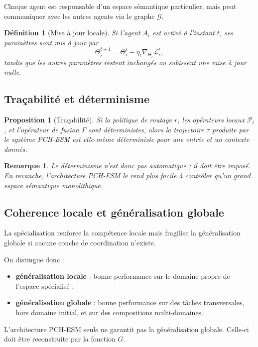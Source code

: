 \documentclass[11pt,a4paper]{article}
\newtheorem{definition}{Définition}[section]
\newtheorem{proposition}{Proposition}[section]
\newtheorem{remark}{Remarque}[section]
\newcommand{\Pcal}{\mathcal P}
\newcommand{\Gcal}{\mathcal G}
\newcommand{\1}{\mathbf 1}
\begin{document}
Chaque agent est responsable d'un espace sémantique particulier, mais peut communiquer avec les autres agents via le graphe \(\Gcal\).

\begin{definition}[Mise à jour locale]
Si l'agent \(A_i\) est activé à l'instant \(t\), ses paramètres sont mis à jour par
\[
\Theta_i^{t+1}
=
\Theta_i^t
-
\eta_t \nabla_{\Theta_i}\mathcal L_i^t,
\]
tandis que les autres paramètres restent inchangés ou subissent une mise à jour nulle.
\end{definition}

\subsection{Traçabilité et déterminisme}

\begin{proposition}[Traçabilité]
Si la politique de routage \(r\), les opérateurs locaux \(\Pcal_i\), et l'opérateur de fusion \(\Gamma\) sont déterministes, alors la trajectoire \(\tau\) produite par le système PCH-ESM est elle-même déterministe pour une entrée et un contexte donnés.
\end{proposition}

\begin{remark}
Le déterminisme n'est donc pas automatique ; il doit être imposé. En revanche, l'architecture PCH-ESM le rend plus facile à contrôler qu'un grand espace sémantique monolithique.
\end{remark}

\subsection{Coherence locale et généralisation globale}

La spécialisation renforce la compétence locale mais fragilise la généralisation globale si aucune couche de coordination n'existe.

On distingue donc :

\begin{itemize}[leftmargin=2em]
    \item \textbf{généralisation locale} : bonne performance sur le domaine propre de l'espace spécialisé ;
    \item \textbf{généralisation globale} : bonne performance sur des tâches transversales, hors domaine initial, et sur des compositions multi-domaines.
\end{itemize}

L'architecture PCH-ESM seule ne garantit pas la généralisation globale. Celle-ci doit être reconstruite par la fonction \(G\).
\end{document}
